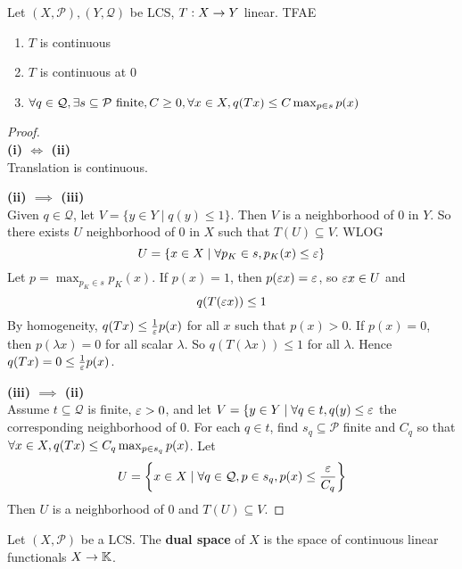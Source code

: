 \documentclass{article}
\begin{document}
\begin{nlemma}\label{lem:lcs-continuity}
  Let $(X, \mathcal P), (Y, \mathcal Q)$ be LCS, $T : X \rightarrow Y$ linear. TFAE
  \begin{enumerate}
    \item $T$ is continuous
    \item $T$ is continuous at $0$
    \item $\forall q \in \mathcal Q, \exists s \subseteq \mathcal P \text{ finite}, C \ge 0, \forall x \in X, q(Tx) \le C\max_{p \in s} p(x)$
  \end{enumerate}
\end{nlemma}
\begin{proof}~\\
  {\bf (i) $\iff$ (ii)} \\
  Translation is continuous.

  {\bf (ii) $\implies$ (iii)} \\
  Given $q \in \mathcal Q$, let $V = \{y \in Y \mid q(y) \le 1\}$. Then $V$ is a neighborhood of $0$ in $Y$. So there exists $U$ neighborhood of $0$ in $X$ such that $T(U) \subseteq V$. WLOG
  $$U = \{x \in X \mid \forall p_K \in s, p_K(x) \le \varepsilon\}$$
  Let $p = \max_{p_K \in s} p_K(x)$. If $p(x) = 1$, then $p(\varepsilon x) = \varepsilon$, so $\varepsilon x \in U$ and
  $$q(T(\varepsilon x)) \le 1$$
  By homogeneity, $q(Tx) \le \frac 1{\varepsilon} p(x)$ for all $x$ such that $p(x) > 0$. If $p(x) = 0$, then $p(\lambda x) = 0$ for all scalar $\lambda$. So $q(T(\lambda x)) \le 1$ for all $\lambda$. Hence $q(Tx) = 0 \le \frac 1{\varepsilon} p(x)$.

  {\bf (iii) $\implies$ (ii)} \\
  Assume $t \subseteq \mathcal Q$ is finite, $\varepsilon > 0$, and let $V = \{y \in Y \mid \forall q \in t, q(y) \le \varepsilon$ the corresponding neighborhood of $0$. For each $q \in t$, find $s_q \subseteq \mathcal P$ finite and $C_q$ so that $\forall x \in X, q(Tx) \le C_q\max_{p \in s_q}p(x)$. Let
  $$U = \left\{x \in X \mid \forall q \in \mathcal Q, p \in s_q, p(x) \le \frac{\varepsilon}{C_q}\right\}$$
  Then $U$ is a neighborhood of $0$ and $T(U) \subseteq V$.
\end{proof}

\begin{defi}
  Let $(X, \mathcal P)$ be a LCS. The {\bf dual space} of $X$ is the space of continuous linear functionals $X \rightarrow \mathbb K$.
\end{defi}

\newlec
\end{document}
